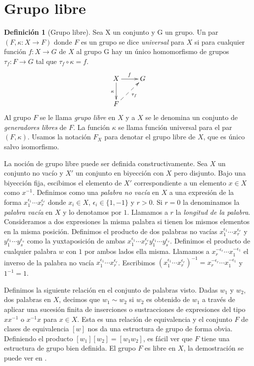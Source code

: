 \documentclass[12pt]{book}
\theoremstyle{definition}
\newtheorem{defi}{Definición}[section]
\begin{document}
\section{Grupo libre}
\label{sec:grupo_libre}
\begin{defi}[Grupo libre]
Sea X un conjunto y G un grupo. Un par $(F,\kappa:X\rightarrow F)$ donde $F$ es un grupo se dice \textit{universal} para $X$ si para cualquier función $f:X\rightarrow G$ de $X$ al grupo G hay un único homomorfismo de grupos $\tau_f:F\rightarrow G$ tal que $\tau_f\circ\kappa = f.$
$$
\xymatrix{
X \ar[d]_\kappa\ar[r]^f & G \\
F \ar@{-->}_{\tau_f}[ur] &
}
$$
Al grupo $F$ se le llama \textit{grupo libre} en $X$ y a $X$ se le denomina un conjunto de \textit{generadores libres} de $F$. La función $\kappa$ se llama función universal para el par $(F,\kappa)$. Usamos la notación $F_X$ para denotar el grupo libre de $X$, que es único salvo isomorfismo.



La noción de grupo libre puede ser definida constructivamente. Sea $X$ un conjunto no vacío y $X'$ un conjunto en biyección con $X$ pero disjunto. Bajo una biyección fija, escibimos el elemento de $X'$ correspondiente a un elemento $x\in X$ como $x^{-1}$. Definimos como una \textit{palabra no vacía} en $X$ a una expresión de la forma $x_1^{\epsilon_1}\cdots x_r^{\epsilon_r}$ donde $x_i\in X$, $\epsilon_i\in\{1,-1\}$ y $r>0$. Si $r = 0$ la denominamos la \textit{palabra vacía} en $X$ y lo denotamos por $1$. Llamamos a $r$ la \textit{longitud de la palabra}. Consideramos a dos expresiones la misma palabra si tienen los mismos elementos en la misma posición. Definimos el producto de dos palabras no vacías $x_1^{\epsilon_1}\cdots x_r^{\epsilon_r}$ y $y_1^{\epsilon_1}\cdots y_s^{\epsilon_s}$ como la yuxtaposición de ambas $x_1^{\epsilon_1}\cdots x_r^{\epsilon_r}y_1^{\epsilon_1}\cdots y_s^{\epsilon_s}$. Definimos el producto de cualquier palabra $w$ con $1$ por ambos lados ella misma. Llamamos a $x_r^{-\epsilon_r}\cdots x_1^{-\epsilon_1}$ el inverso de la palabra no vacía $x_1^{\epsilon_1}\cdots x_r^{\epsilon_r}$. Escribimos $(x_1^{\epsilon_1}\cdots x_r^{\epsilon_r})^{-1}=x_r^{-\epsilon_r}\cdots x_1^{-\epsilon_1}$ y $1^{-1}=1$. 

Definimos la siguiente relación en el conjunto de palabras visto. Dadas $w_1$ y $w_2$, dos palabras en $X$, decimos que $w_1\sim w_2$ si $w_2$ es obtenido de $w_1$ a través de aplicar una sucesión finita de inserciones o sustracciones de expresiones del tipo $xx^{-1}$ o $x^{-1}x$ para $x\in X$. Esta es una relación de equivalencia y el conjunto $F$ de clases de equivalencia $[w]$ nos da una estructura de grupo de forma obvia. Definiendo el producto $[w_1][w_2]=[w_1w_2]$, es fácil ver que $F$ tiene una estructura de grupo bien definida. El grupo $F$ es libre en $X$, la demostración se puede ver en \cite{free}.


\end{defi}
\end{document}
